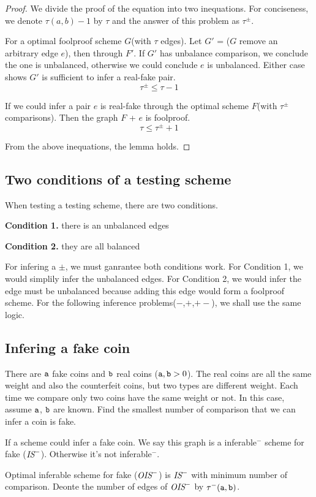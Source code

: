 \begin{proof}
We divide the proof of the equation into two inequations. For conciseness, we denote $\tau(a,b)-1$ by $\tau$ and the answer of this problem as $\tau^\pm$.

For a optimal foolproof scheme $G$(with $\tau$ edges). Let $G'$ = ($G$ remove an arbitrary edge $e$), then through $F'$.
If $G'$ has unbalance comparison, we conclude the one is unbalanced, otherwise we could conclude $e$ is unbalanced.
Either case shows $G'$ is sufficient to infer a real-fake pair.
\[\tau^\pm \leq \tau-1\]

If we could infer a pair $e$ is real-fake through the optimal scheme $F$(with $\tau^\pm$ comparisons).
Then the graph $F$ + $e$ is foolproof.
\[\tau\leq \tau^\pm+1\]

From the above inequations, the lemma holds.

\end{proof}
\subsection*{Two conditions of a testing scheme}

When testing a testing scheme, there are two conditions.

\textbf{Condition 1.} there is an unbalanced edges

\textbf{Condition 2.} they are all balanced

For infering a $\pm$, we must ganrantee both conditions work. For Condition 1, we would simplily infer the unbalanced edges. For Condition 2, we would infer the edge must be unbalanced because adding this edge would form a foolproof scheme.
For the following inference problems($-$,$+$,$+-$), we shall use the same logic. 

\subsection*{Infering a fake coin}
{
\setlength{\leftskip}{1cm}
\setlength{\rightskip}{1cm}
\noindent 
There are $\mathtt{a}$ fake coins and $\mathtt{b}$ real coins ($\mathtt{a}, \mathtt{b} > 0$). The real coins are all the same weight and also the counterfeit coins, but two  types are different weight. Each time we compare only two coins have the same weight or not. In this case, assume $\mathtt{a}$, $\mathtt{b}$ are known.
Find the smallest number of comparison that we can infer a coin is fake.\\

}

\begin{definition}
If a scheme could infer a fake coin. We say this graph is a inferable$^-$ scheme for fake ($\text{\it IS}^-$). Otherwise it's not inferable$^-$.

Optimal inferable scheme for fake ($\text{\it OIS}^-$) is $\text{\it IS}^-$ with minimum number of comparison.
Deonte the number of edges of $\text{\it OIS}^-$ by $\tau^-(\mathtt{a},\mathtt{b})$.
\end{definition}

